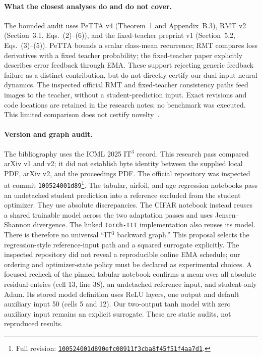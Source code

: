 \documentclass[11pt,a4paper]{article}
\begin{document}
\paragraph{What the closest analyses do and do not cover.}
The bounded audit uses PeTTA v4 (Theorem~1 and Appendix~B.3), RMT v2
(Section~3.1, Eqs.~(2)--(6)), and the fixed-teacher preprint v1
(Section~5.2, Eqs.~(3)--(5)). PeTTA bounds a scalar class-mean recurrence;
RMT compares loss derivatives with a fixed teacher probability;
the fixed-teacher paper explicitly describes error feedback through EMA.
These support rejecting generic feedback failure as a distinct contribution,
but do not directly certify our dual-input neural dynamics.
The inspected official RMT and fixed-teacher consistency paths feed images
to the teacher, without a student-prediction input. Exact revisions and code
locations are retained in the research notes; no benchmark was executed.
This limited comparison does not certify novelty~\cite{petta,rmt,fixedteacher}.

\paragraph{Version and graph audit.}
The bibliography uses the ICML 2025 IT$^3$ record. This research pass compared
arXiv v1 and v2; it did not establish byte identity between the supplied
local PDF, arXiv v2, and the proceedings PDF. The official repository was
inspected at commit \texttt{100524001d89}\footnote{Full revision:
\href{https://github.com/nikitadurasov/ittt/tree/100524001d890efc08911f3cba8f45f51f4aa7d1}{\texttt{100524001d890efc08911f3cba8f45f51f4aa7d1}}.}.
The tabular, airfoil, and age regression notebooks pass an undetached student
prediction into a reference excluded from the student optimizer. They use
absolute discrepancies. The CIFAR notebook instead reuses a shared
trainable model across the two adaptation passes and uses Jensen--Shannon
divergence. The linked \texttt{torch-ttt} implementation also reuses its
model. There is therefore no universal ``IT$^3$ backward graph.'' This
proposal selects the regression-style reference-input path and a squared
surrogate explicitly. The inspected repository did not reveal a reproducible
online EMA schedule; our ordering and optimizer-state policy must be declared
as experimental choices. A focused recheck of the pinned tabular notebook
confirms a mean over all absolute residual entries (cell 13, line 38),
an undetached reference input, and student-only Adam. Its stored model
definition uses ReLU layers, one output and default auxiliary input 50
(cells 5 and 12). Our two-output tanh model with zero auxiliary input
remains an explicit surrogate. These are static audits, not reproduced results.
\end{document}
